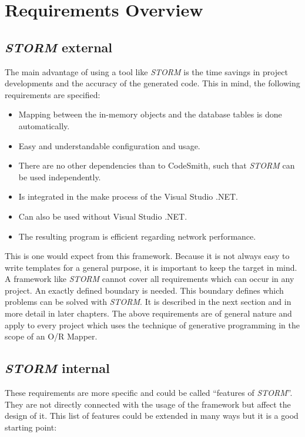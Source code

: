 \chapter{Requirements Overview}

	\section{\textit{STORM} external}
		The main advantage of using a tool like \textit{STORM} is the time savings in
		project developments and the accuracy of the generated code. This in mind, the
		following requirements are specified:
		
		\begin{itemize}
			\item Mapping between the in-memory objects and the database tables is done automatically.
			\item Easy and understandable configuration and usage.
			\item There are no other dependencies than to CodeSmith, such that \textit{STORM} can
						be used independently.
			\item Is integrated in the make process of the Visual Studio .NET.
			\item Can also be used without Visual Studio .NET.
			\item The resulting program is efficient regarding network performance.
		\end{itemize}
		
		This is one would expect from this framework.
		Because it is not always easy to write templates for a general purpose,
		it is important to keep the target in mind. A framework like \textit{STORM}
		cannot cover all requirements which can occur in any project. An exactly
		defined boundary is needed. This boundary defines which problems can be solved
		with \textit{STORM}. It is described in the next section and in more
		detail in later chapters. The above requirements are of general nature and
		apply to every project which uses the technique of generative programming in
		the scope of an O/R Mapper.
	
	\section{\textit{STORM} internal}
		These requirements are more specific and could be called ``features of
		\textit{STORM}''. They are not directly connected with the usage of the 
		framework but affect the design of it. This list of features could
		be extended in many ways but it is a good starting point:
		
